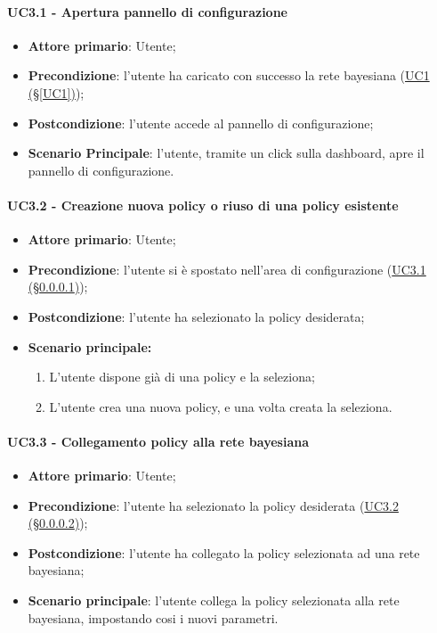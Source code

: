 \paragraph{UC3.1 - Apertura pannello di configurazione}\label{UC3.1}
\begin{itemize}
	\item \textbf{Attore primario}: Utente; 
	\item \textbf{Precondizione}: l'utente ha caricato con successo la rete bayesiana (\hyperref[UC1]{UC1 (§\ref*{UC1})});
	\item \textbf{Postcondizione}: l'utente accede al pannello di configurazione;
	\item \textbf{Scenario Principale}: l'utente, tramite un click sulla dashboard, apre il pannello di configurazione. 
\end{itemize}

\paragraph{UC3.2 - Creazione nuova policy o riuso di una policy esistente}\label{UC3.2}

\begin{itemize}
	\item \textbf{Attore primario}: Utente; 
	\item \textbf{Precondizione}: l'utente si è spostato nell'area di configurazione (\hyperref[UC3.1]{UC3.1 (§\ref*{UC3.1})});
	\item \textbf{Postcondizione}: l'utente ha selezionato la policy desiderata;
	\item \textbf{Scenario principale:}
	\begin{enumerate}
		\item L'utente dispone già di una policy e la seleziona; 
		\item L'utente crea una nuova policy, e una volta creata la seleziona. 
	\end{enumerate}
	
\end{itemize}

\paragraph{UC3.3 - Collegamento policy alla rete bayesiana}\label{UC3.3}
\begin{itemize}
	\item \textbf{Attore primario}: Utente; 
	\item \textbf{Precondizione}: l'utente ha selezionato la policy desiderata (\hyperref[UC3.2]{UC3.2 (§\ref*{UC3.2})});
	\item \textbf{Postcondizione}: l'utente ha collegato la policy selezionata ad una rete bayesiana; 
	\item \textbf{Scenario principale}: l'utente collega la policy selezionata alla rete bayesiana, impostando cosi i nuovi parametri. 
\end{itemize}

